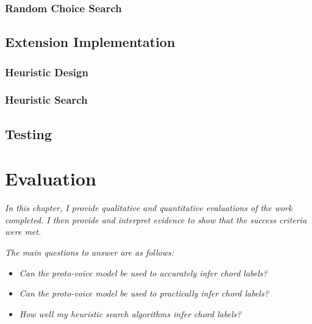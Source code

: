 \documentclass[12pt,a4paper,twoside,openright]{report}
\begin{document}
\subsection{Random Choice Search}
\section{Extension Implementation}
\subsection{Heuristic Design}
\subsection{Heuristic Search}
\section{Testing}


\chapter{Evaluation}
\textit{In this chapter, I provide qualitative and quantitative evaluations of the work completed. I then provide and interpret evidence to show that the success criteria were met.}

\textit{The main questions to answer are as follows:}
\begin{itemize}
  \item \textit{Can the proto-voice model be used to accurately infer chord labels?}
  \item \textit{Can the proto-voice model be used to practically infer chord labels?}
  \item \textit{How well my heuristic search algorithms infer chord labels?}
\end{itemize}
\end{document}
